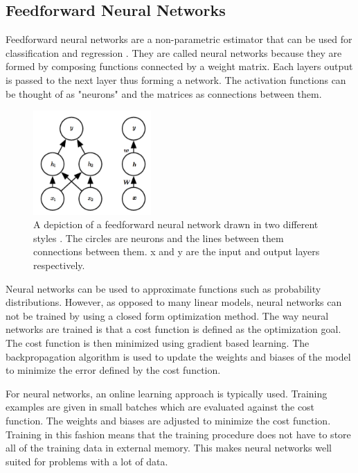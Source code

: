 
\subsection{Feedforward Neural Networks}

Feedforward neural networks are a non-parametric estimator that can be used for classification and regression \cite{alpaydin}. They are called neural networks because they are formed by composing functions connected by a weight matrix. Each layers output is passed to the next layer thus forming a network. The activation functions can be thought of as "neurons" and the matrices as connections between them.

\begin{figure}[H]
\centering
\includegraphics[width=0.4\textwidth]{images/nnet.png}
\caption{
A depiction of a feedforward neural network drawn in two different styles \cite{deep-learning-book}. The circles are neurons and the lines between them connections between them. x and y are the input and output layers respectively.
}
\label{fig:nnet}
\end{figure}

Neural networks can be used to approximate functions such as probability distributions. However, as opposed to many linear models, neural networks can not be trained by using a closed form optimization method. The way neural networks are trained is that a cost function is defined as the optimization goal. The cost function is then minimized using gradient based learning. The backpropagation algorithm is used to update the weights and biases of the model to minimize the error defined by the cost function.

For neural networks, an online learning approach is typically used. Training examples are given in small batches which are evaluated against the cost function. The weights and biases are adjusted to minimize the cost function. Training in this fashion means that the training procedure does not have to store all of the training data in external memory. This makes neural networks well suited for problems with a lot of data.

